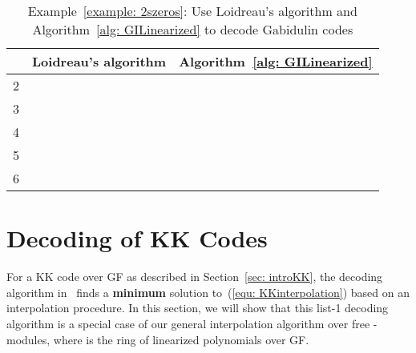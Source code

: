 \documentclass[11pt,onecolumn,draftcls]{IEEEtran}
\begin{document}
\begin{table*}[htbp]
\begin{center}
\caption{Example~\ref{example: 2szeros}: Use Loidreau's algorithm and Algorithm~\ref{alg: GILinearized} to decode Gabidulin codes}
\label{tab: LdvsGI}
\begin{tabular}{|l|l|l|}
\hline
  &  Loidreau's algorithm   &  Algorithm~\ref{alg: GILinearized} \\ \hline
\multirow{2}{*}{2} &  &  \\
    &  &  \\ \hline

\multirow{3}{*}{3} &  &  \\		
		&  &  \\
    &  &  \\ \hline

\multirow{3}{*}{4} &  &  \\		
		&  &  \\
    &  &  \\ \hline

\multirow{3}{*}{5} &  &  \\		
		&  &  \\
    &  &  \\ \hline

\multirow{2}{*}{6} &  &  \\		
		&  &  \\ \hline
\end{tabular}
\end{center}
\end{table*}



\section{Decoding of KK Codes} \label{sec: generalKK}

For a KK code over GF as described in Section~\ref{sec: introKK}, the decoding algorithm in~\cite{kotter_it08} finds a \textbf{minimum} solution to~(\ref{equ: KKinterpolation}) based on an interpolation procedure. In this section, we will show that this list-1 decoding algorithm is a special case of our general interpolation algorithm over free -modules, where   is the ring of linearized polynomials over GF.
\end{document}

